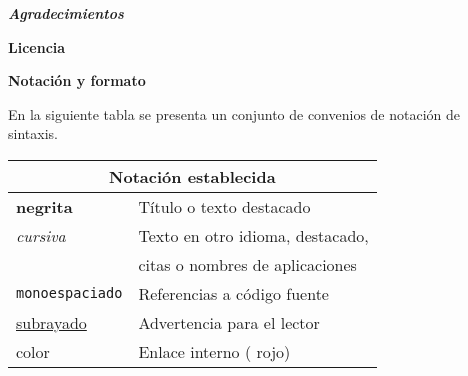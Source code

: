 


{\large \textbf{\textit{Agradecimientos}}}
\lorem{}
\blankpage{}

{\large \textbf{Licencia}} \bigskip

%
%
%
%

\blankpage{}

{\large \textbf{Notación y formato}} \smallskip 

En la siguiente tabla se presenta un conjunto de convenios de notación de sintaxis.\smallskip 

\begin{tabular}{ll} \toprule
    \multicolumn{2}{c}{Notación establecida} \\ \midrule
    \textbf{negrita} & Título o texto destacado \\ \midrule
    \textit{cursiva} & Texto en otro idioma, destacado, \\ & citas o nombres de aplicaciones \\ \midrule
    \texttt{monoespaciado} & Referencias a código fuente \\ \midrule
    \underline{subrayado} & Advertencia para el lector \\ \midrule
    color &  Enlace interno ({\color{Red} rojo}) \\ \midrule
\end{tabular}

